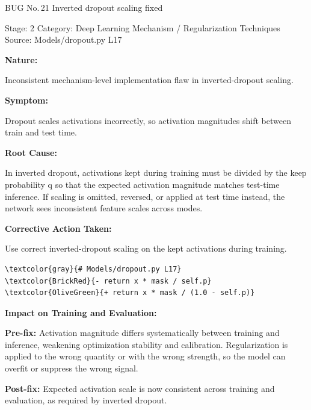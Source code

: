 \documentclass[10pt]{article}
\newcommand{\FieldLabel}[1]{%
 {\bfseries #1:}\par
}
\begin{document}
\begin{bugbox}{BUG No.\,21 \quad Inverted dropout scaling fixed}
{\color{MetaGray}\small Stage: 2 \;\textbar\; Category: Deep Learning Mechanism / Regularization Techniques \;\textbar\; Source: Models/dropout.py L17\par}
\vspace{0.22em}
\FieldLabel{Nature}
Inconsistent mechanism-level implementation flaw in inverted-dropout scaling.
\par
\vspace{0.35em}
\FieldLabel{Symptom}
Dropout scales activations incorrectly, so activation magnitudes shift between train and test time.
\par
\vspace{0.35em}
\FieldLabel{Root Cause}
In inverted dropout, activations kept during training must be divided by the keep probability q so that the expected activation magnitude matches test-time inference. If scaling is omitted, reversed, or applied at test time instead, the network sees inconsistent feature scales across modes.
\par
\vspace{0.35em}
\FieldLabel{Corrective Action Taken}
Use correct inverted-dropout scaling on the kept activations during training.
\par
\vspace{0.35em}
\begin{Verbatim}[commandchars=\\\{\},fontsize=\footnotesize,breaklines=true,breaksymbol={},frame=leftline,framerule=2pt,rulecolor=\color{gray!40},xleftmargin=6pt,formatcom=\singlespacing]
\textcolor{gray}{# Models/dropout.py L17}
\textcolor{BrickRed}{- return x * mask / self.p}
\textcolor{OliveGreen}{+ return x * mask / (1.0 - self.p)}
\end{Verbatim}
\vspace{0.22em}
\FieldLabel{Impact on Training and Evaluation}
\textbf{Pre-fix:} Activation magnitude differs systematically between training and inference, weakening optimization stability and calibration. Regularization is applied to the wrong quantity or with the wrong strength, so the model can overfit or suppress the wrong signal. \par\smallskip
\textbf{Post-fix:} Expected activation scale is now consistent across training and evaluation, as required by inverted dropout. 
\par
\vspace{0.35em}
\end{bugbox}
\end{document}

